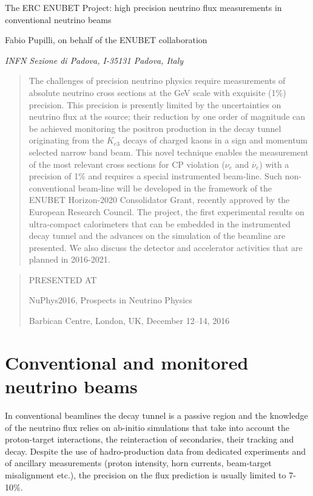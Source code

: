 \documentclass[12pt]{article}
\newcommand\pubnumber{NuPhys2016-Pupilli}
\newcommand\pubdate{\today}
\def\INFNPD{INFN Sezione di Padova, I-35131 Padova, Italy}
\def\Title#1{\begin{center} {\Large #1 } \end{center}}
\def\Author#1{\begin{center}{ \sc #1} \end{center}}
\def\Address#1{\begin{center}{ \it #1} \end{center}}
\newcommand\pubblock{\rightline{\begin{tabular}{l} \pubnumber\\
         \pubdate  \end{tabular}}}
\newenvironment{Abstract}{\begin{quotation}  }{\end{quotation}}
\newenvironment{Presented}{\begin{quotation} \begin{center} 
             PRESENTED AT\end{center}\bigskip 
      \begin{center}\begin{large}}{\end{large}\end{center} \end{quotation}}
\begin{document}
\begin{titlepage}
\pubblock   %

\vfill
\Title{The ERC ENUBET Project: high precision neutrino flux measurements in conventional neutrino beams}
\vfill
\Author{Fabio Pupilli, on behalf of the ENUBET collaboration}
\Address{\INFNPD}
\vfill
\begin{Abstract}
The challenges of precision neutrino physics require measurements of
absolute neutrino
cross sections at the GeV scale with exquisite (1\%) precision. This
precision is presently
limited by the uncertainties on neutrino flux at the source; their reduction
by one order of magnitude can be achieved monitoring the positron
production in the decay
tunnel originating from the $K_{e3}$ decays of charged kaons in a sign
and momentum selected
narrow band beam. This novel technique enables the measurement of the
most relevant
cross sections for CP violation ($\nu_e$ and $\overline{\nu}_e$) with a precision of
1\% and requires a special
instrumented beam-line. Such non-conventional beam-line will be
developed in the framework
of the ENUBET Horizon-2020 Consolidator Grant, recently approved by
the European Research
Council. The project, the first experimental results
on ultra-compact calorimeters
that can be embedded in the instrumented decay tunnel and the advances
on the simulation of the
beamline are presented. We also discuss the detector and accelerator activities
that are planned in 2016-2021.
\end{Abstract}
\vfill
\begin{Presented}
NuPhys2016, Prospects in Neutrino Physics

Barbican Centre, London, UK,  December 12--14, 2016
\end{Presented}
\vfill
\end{titlepage}
\def\thefootnote{\fnsymbol{footnote}}
\setcounter{footnote}{0}
%

\section{Conventional and monitored neutrino beams}
In conventional beamlines the decay tunnel is a passive region and the knowledge of the neutrino flux relies on ab-initio
simulations that take into account the proton-target interactions, the reinteraction of secondaries, their tracking and decay. 
Despite the use of hadro-production data from dedicated experiments and of ancillary measurements (proton intensity, horn
currents, beam-target misalignment etc.), the precision on the flux prediction is usually limited to 7-10\%.
\end{document}
